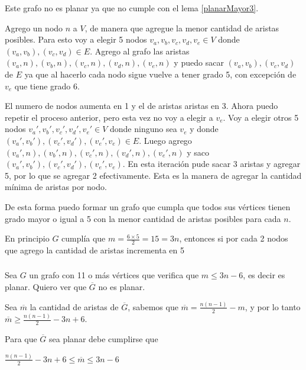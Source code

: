 Este grafo no es planar ya que no cumple con el lema \ref{planarMayor3}.

Agrego un nodo $n$ a $V$, de manera que agregue la menor cantidad de aristas posibles. Para esto voy a elegir 5 nodos $v_a, v_b, v_c, v_d, v_e \in V$ donde $(v_a, v_b), (v_c, v_d) \in E$. Agrego al grafo las aristas $(v_a, n), (v_b, n), (v_c, n), (v_d, n), (v_e, n)$ y puedo sacar $(v_a, v_b), (v_c, v_d)$ de $E$ ya que al hacerlo cada nodo sigue vuelve a tener grado 5, con excepción de $v_e$ que tiene grado 6.

El numero de nodos aumenta en 1 y el de aristas aristas en 3. Ahora puedo repetir el proceso anterior, pero esta vez no voy a elegir a $v_e$. Voy a elegir otros 5 nodos $v_a', v_b', v_c', v_d', v_e' \in V$ donde ninguno sea $v_e$ y donde $(v_a', v_b'), (v_c', v_d'), (v_e', v_e) \in E$. Luego agrego $(v_a', n), (v_b', n), (v_c', n), (v_d', n), (v_e', n)$ y saco $(v_a', v_b'), (v_c', v_d'), (v_e', v_e)$. En esta iteración pude sacar 3 aristas y agregar 5, por lo que se agregar 2 efectivamente. Esta es la manera de agregar la cantidad mínima de aristas por nodo.

De esta forma puedo formar un grafo que cumpla que todos sus vértices tienen grado mayor o igual a 5 con la menor cantidad de aristas posibles para cada $n$.

En principio $G$ cumplía que $m = \frac{6 \times 5}{2} = 15 = 3n$, entonces si por cada 2 nodos que agrego la cantidad de aristas incrementa en 5

\subsubsection{}
Sea $G$ un grafo con 11 o más vértices que verifica que $m \leq 3n - 6$, es decir es planar. Quiero ver que $\overline{G}$ no es planar.

Sea $\overline{m}$ la cantidad de aristas de $\overline{G}$, sabemos que $\overline{m} = \frac{n(n - 1)}{2} - m$, y por lo tanto $\overline{m} \geq \frac{n(n - 1)}{2} - 3n + 6$.

Para que $\overline{G}$ sea planar debe cumplirse que 

\begin{center}
    $\frac{n(n - 1)}{2} - 3n + 6 \leq \overline{m} \leq 3n - 6$



\end{center}